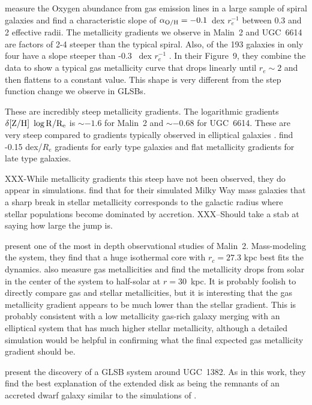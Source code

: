 \documentclass{emulateapj}
\begin{document}
\citet{Sanchez14} measure the Oxygen abundance from gas emission lines in a large sample of spiral galaxies and find a characteristic slope of $\alpha_{\rm{O/H}} = -0.1$\ dex $r_e^{-1}$ between 0.3 and 2 effective radii.  The metallicity gradients we observe in Malin~2 and UGC~6614 are factors of 2-4 steeper than the typical spiral. Also, of the 193 galaxies in \citet{Sanchez14} only four have a slope steeper than -0.3 \ dex $r_e^{-1}$ \citep[Figure~6]{Sanchez14}.  In their Figure~9, they combine the data to show a typical gas metallicity curve that drops linearly until $r_e\sim2$ and then flattens to a constant value.  This shape is very different from the step function change we observe in GLSBs.


These are incredibly steep metallicity gradients.  The logarithmic gradients $\delta \rm{[Z/H]}\ \log{R/R_e}$ is $\sim -1.6$ for Malin~2 and $\sim -0.68$ for UGC~6614.  These are very steep compared to gradients typically observed in elliptical galaxies \citep{Kuntschner10, Greene12, Greene15}.  \citet{Wilkinson15} find -0.15 dex/$R_e$ gradients for early type galaxies and flat metallicity gradients for late type galaxies. 

XXX-While metallicity gradients this steep have not been observed, they do appear in simulations. \citet{Sanderson17} find that for their simulated Milky Way mass galaxies that a sharp break in stellar metallicity corresponds to the galactic radius where stellar populations become dominated by accretion. XXX--Should take a stab at saying how large the jump is.




\citet{Kasparova14} present one of the most in depth observational studies of Malin~2.  Mass-modeling the system, they find that a huge isothermal core with $r_c=27.3$ kpc best fits the dynamics.  \citet{Kasparova14} also measure gas metallicities and find the metallicity drops from solar in the center of the system to half-solar at $r=30$\ kpc.  It is probably foolish to directly compare gas and stellar metallicities, but it is interesting that the gas metallicity gradient appears to be much lower than the stellar gradient.  This is probably consistent with a low metallicity gas-rich galaxy merging with an elliptical system that has much higher stellar metallicity, although a detailed simulation would be helpful in confirming what the final expected gas metallicity gradient should be.


\citet{Hagen16} present the discovery of a GLSB system around UGC~1382.  As in this work, they find the best explanation of the extended disk as being the remnants of an accreted dwarf galaxy similar to the simulations of \citet{Pen06}. 
\end{document}
